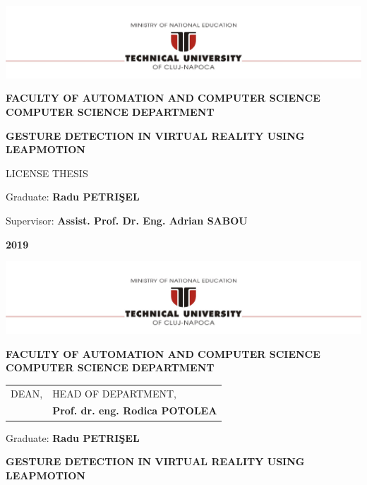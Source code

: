 \documentclass[12pt,a4paper,twoside]{report}
\renewcommand{\thesisauthor}{Radu PETRIŞEL}    %
\renewcommand{\thesisyear}{2019}      %
\renewcommand{\thesistitle}{GESTURE DETECTION IN VIRTUAL REALITY USING LEAPMOTION}
\renewcommand{\thesissupervisor}{Assist. Prof. Dr. Eng. Adrian SABOU}
\newcommand{\department}{\bf FACULTY OF AUTOMATION AND COMPUTER SCIENCE\\
COMPUTER SCIENCE DEPARTMENT}
\newcommand{\thesis}{LICENSE THESIS}
\newcommand{\utcnlogo}{\includegraphics[width=15cm]{img/tucn.jpg}}
\begin{document}

\newenvironment{definition}[1][Defini\c{t}ie.]{\begin{trivlist}
\item[\hskip \labelsep {\bfseries #1}]}{\end{trivlist}}


\setcounter{page}{1}

\begin{center}
\utcnlogo

\department

\vspace{4cm}

{\bf \thesistitle} %

\vspace{1.5cm}

\thesis
\vspace{6cm}

Graduate: {\bf \thesisauthor{}} 

Supervisor: {\bf \thesissupervisor{}}

\vspace{3cm}
{\bf \thesisyear}
\end{center}

\thispagestyle{empty}
\newpage

\begin{center}
\utcnlogo

\department

\end{center}
\vspace{0.5cm}

\begin{tabular}{p{7cm}p{8cm}}
 \hspace{-1cm}DEAN, & HEAD OF DEPARTMENT,\\
 \hspace{-1cm}{\bf Prof. dr. eng. Liviu MICLEA} & {\bf Prof. dr. eng. Rodica POTOLEA}\\  
\end{tabular}
 
\vspace{2cm}

\begin{center}
Graduate: {\bf \thesisauthor}

\vspace{1cm}

{\bf \thesistitle}
\end{center}
\end{document}
